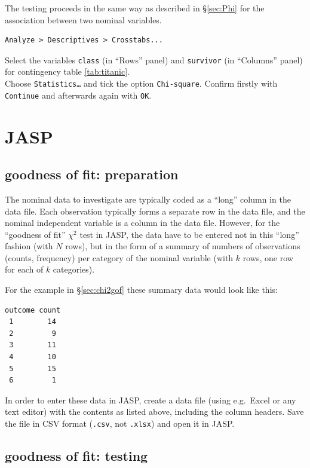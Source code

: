 \documentclass[
]{book}
\begin{document}
The testing proceeds in the same way as described in
§\ref{sec:Phi} for
the association between two nominal variables.

\begin{verbatim}
Analyze > Descriptives > Crosstabs...
\end{verbatim}

Select the variables \texttt{class} (in ``Rows'' panel) and \texttt{survivor} (in
``Columns'' panel) for
contingency table \ref{tab:titanic}.\\
Choose \texttt{Statistics…} and tick the option \texttt{Chi-square}. Confirm firstly with
\texttt{Continue} and afterwards again with \texttt{OK}.

\section{JASP}\label{jasp-15}

\subsection{goodness of fit: preparation}\label{goodness-of-fit-preparation-1}

The nominal data to investigate are typically coded as a ``long'' column in the data file. Each observation typically forms a separate row in the data file, and the nominal independent variable is a column in the data file. However, for the ``goodness of fit'' \(\chi^2\) test in JASP, the data have to be entered not in this ``long'' fashion (with \(N\) rows), but in the form of a summary of numbers of observations (counts, frequency) per category of the nominal variable (with \(k\) rows, one row for each of \(k\) categories).

For the example in §\ref{sec:chi2gof} these summary data would look like this:

\begin{verbatim}
outcome count
 1        14
 2         9
 3        11
 4        10
 5        15
 6         1
\end{verbatim}

In order to enter these data in JASP, create a data file (using e.g.~Excel or any text editor) with the contents as listed above, including the column headers. Save the file in CSV format (\texttt{.csv}, not \texttt{.xlsx}) and open it in JASP.

\subsection{goodness of fit: testing}\label{goodness-of-fit-testing-1}
\end{document}
